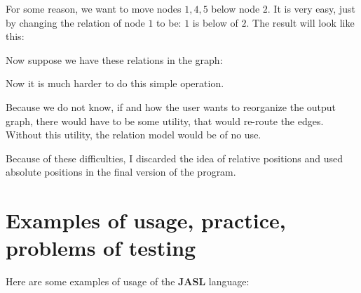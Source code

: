 \documentclass{ctuthesis}
\begin{document}
For some reason, we want to move nodes $1,4,5$ below node $2$. It is very easy, just by changing the relation of node $1$ to be: $1$ is below of $2$. The result will look like this:

\begin{figure}[H]
\centering
{}
\end{figure}

Now suppose we have these relations in the graph:
\begin{figure}[H]
\centering
{}
\end{figure}

Now it is much harder to do this simple operation. 

Because we do not know, if and how the user wants to reorganize the output graph, there would have to be some utility, that would re-route the edges. Without this utility, the relation model would be of no use.

Because of these difficulties, I discarded the idea of relative positions and used absolute positions in the final version of the program.


\chapter{Examples of usage, practice, problems of testing}
Here are some examples of usage of the \textbf{JASL} language: 
\end{document}

